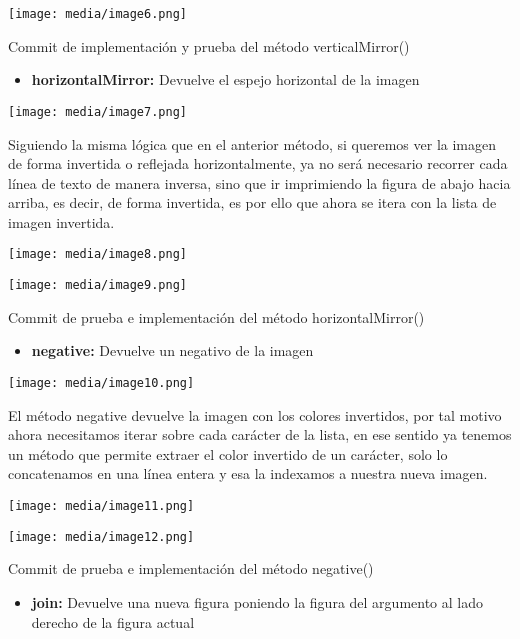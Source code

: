 \documentclass[
]{article}
\begin{document}
\texttt{[image: media/image6.png]}

Commit de implementación y prueba del método verticalMirror()

\begin{itemize}
\item
  \textbf{horizontalMirror:} Devuelve el espejo horizontal de la imagen
\end{itemize}

\texttt{[image: media/image7.png]}

Siguiendo la misma lógica que en el anterior método, si queremos ver la
imagen de forma invertida o reflejada horizontalmente, ya no será
necesario recorrer cada línea de texto de manera inversa, sino que ir
imprimiendo la figura de abajo hacia arriba, es decir, de forma
invertida, es por ello que ahora se itera con la lista de imagen
invertida.

\texttt{[image: media/image8.png]}

\texttt{[image: media/image9.png]}

Commit de prueba e implementación del método horizontalMirror()

\begin{itemize}
\item
  \textbf{negative:} Devuelve un negativo de la imagen
\end{itemize}

\texttt{[image: media/image10.png]}

El método negative devuelve la imagen con los colores invertidos, por
tal motivo ahora necesitamos iterar sobre cada carácter de la lista, en
ese sentido ya tenemos un método que permite extraer el color invertido
de un carácter, solo lo concatenamos en una línea entera y esa la
indexamos a nuestra nueva imagen.

\texttt{[image: media/image11.png]}

\texttt{[image: media/image12.png]}

Commit de prueba e implementación del método negative()

\begin{itemize}
\item
  \textbf{join:} Devuelve una nueva figura poniendo la figura del
  argumento al lado derecho de la figura actual
\end{itemize}
\end{document}
